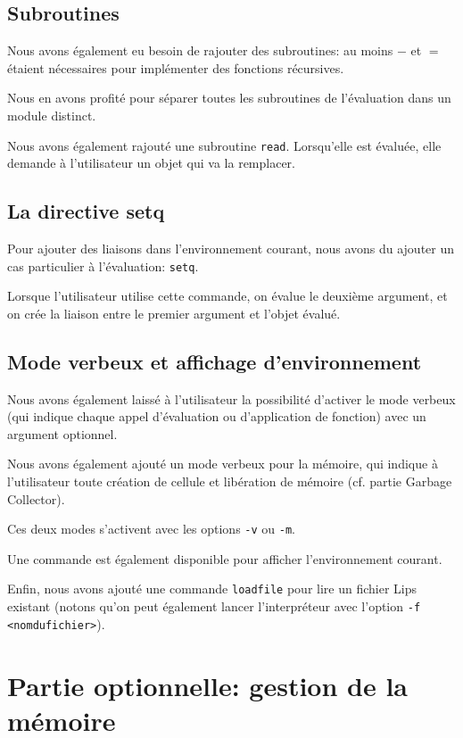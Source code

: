 \documentclass[12pt]{article}
\def\code #1{\lstinline{#1}}
\begin{document}
\subsection{Subroutines}

Nous avons également eu besoin de rajouter des subroutines: au moins $-$ et $=$ étaient nécessaires pour implémenter des fonctions récursives.

Nous en avons profité pour séparer toutes les subroutines de l'évaluation dans un module distinct.

Nous avons également rajouté une subroutine \code{read}. Lorsqu'elle est évaluée, elle demande à l'utilisateur un objet qui va la remplacer.

\subsection{La directive setq}

Pour ajouter des liaisons dans l'environnement courant, nous avons du ajouter un cas particulier à l'évaluation: \code{setq}. 

Lorsque l'utilisateur utilise cette commande, on évalue le deuxième argument, et on crée la liaison entre le premier argument et l'objet évalué.


\subsection{Mode verbeux et affichage d'environnement}

Nous avons également laissé à l'utilisateur la possibilité d'activer le mode verbeux (qui indique chaque appel d'évaluation ou d'application de fonction) avec un argument optionnel.

Nous avons également ajouté un mode verbeux pour la mémoire, qui indique à l'utilisateur toute création de cellule et libération de mémoire (cf. partie Garbage Collector).

Ces deux modes s'activent avec les options \code{-v} ou \code{-m}.

Une commande est également disponible pour afficher l'environnement courant.

Enfin, nous avons ajouté une commande \code{loadfile} pour lire un fichier Lips existant (notons qu'on peut également lancer l'interpréteur avec l'option \code{-f <nomdufichier>}).


\section{Partie optionnelle: gestion de la mémoire}
\end{document}
